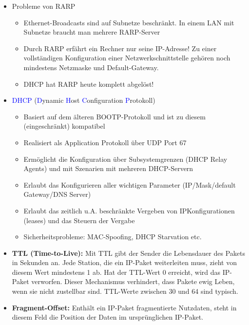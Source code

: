 \begin{itemize}
    \item Probleme von RARP
    \begin{itemize}
        \item Ethernet-Broadcasts sind auf Subnetze beschränkt. In einem LAN mit Subnetze braucht man mehrere RARP-Server
        \item Durch RARP erfährt ein Rechner nur seine IP-Adresse! Zu einer vollständigen Konfiguration einer Netzwerkschnittstelle gehören noch mindestens Netzmaske und Default-Gateway.
        \item DHCP hat RARP heute komplett abgelöst!
    \end{itemize}
    \item \textcolor{blue}{DHCP} (\textcolor{blue}{D}ynamic \textcolor{blue}{H}ost \textcolor{blue}{C}onfiguration \textcolor{blue}{P}rotokoll)
    \begin{itemize}
        \item Basiert auf dem älteren BOOTP-Protokoll und ist zu diesem (eingeschränkt) kompatibel
        \item Realisiert als Application Protokoll über UDP Port 67
        \item Ermöglicht die Konfiguration über Subsystemgrenzen (DHCP Relay Agents) und mit Szenarien mit mehreren DHCP-Servern
        \item Erlaubt das Konfigurieren aller wichtigen Parameter (IP/Mask/default Gateway/DNS Server)
        \item Erlaubt das zeitlich u.A. beschränkte Vergeben von IPKonfigurationen (leases) und das Steuern der Vergabe
        \item Sicherheitsprobleme: MAC-Spoofing, DHCP Starvation etc.
    \end{itemize}
\end{itemize}

\begin{itemize}
    \item \textbf{TTL (Time-to-Live): } Mit TTL gibt der Sender die Lebensdauer des Pakets in Sekunden an.
    Jede Station, die ein IP-Paket weiterleiten muss, zieht von diesem Wert mindestens 1 ab. Hat der TTL-Wert 0 erreicht, wird das IP-Paket verworfen. Dieser Mechanismus verhindert, dass Pakete ewig Leben, wenn sie nicht zustellbar sind. TTL-Werte zwischen 30 und 64 sind typisch.
    \item \textbf{Fragment-Offset:} Enthält ein IP-Paket fragmentierte Nutzdaten, steht in diesem Feld die Position der Daten im ursprünglichen IP-Paket.
\end{itemize}

